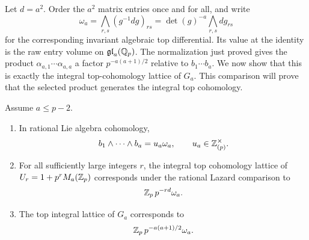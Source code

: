 Let $d=a^2$.  Order the $a^2$ matrix entries once and for all, and
write
\[
 \omega_a=\bigwedge_{r,s}(g^{-1}dg)_{rs}
          =\det(g)^{-a}\bigwedge_{r,s}dg_{rs}
\]
for the corresponding invariant algebraic top differential.  Its
value at the identity is the raw entry volume on
$\mathfrak{gl}_a(\mathbb Q_p)$.  The normalization just proved gives the
product $\alpha_{a,1}\cdots\alpha_{a,a}$ a factor
$p^{-a(a+1)/2}$ relative to $b_1\cdots b_a$.  We now show that
this is exactly the integral top-cohomology lattice of $G_a$.
This comparison will prove that the selected product generates the
integral top cohomology.

\begin{lemma}\label{lem:top-volume}
Assume $a\leq p-2$.
\begin{enumerate}
\item In rational Lie algebra cohomology,
\[
 b_1\wedge\cdots\wedge b_a=u_a\omega_a,
 \qquad u_a\in\mathbb Z_{(p)}^\times.
\]
\item For all sufficiently large integers $r$, the integral top
cohomology lattice of
$U_r=1+p^rM_a(\mathbb Z_p)$ corresponds under the rational Lazard
comparison to
\[
 \mathbb Z_p\,p^{-rd}\omega_a.
\]
\item The top integral lattice of $G_a$ corresponds to
\[
 \mathbb Z_p\,p^{-a(a+1)/2}\omega_a.
\]
\end{enumerate}
\end{lemma}

